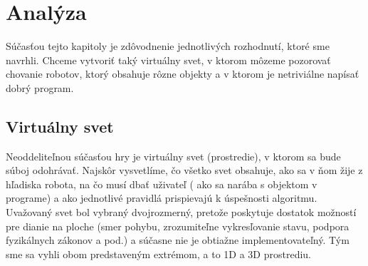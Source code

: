 \chapter{Analýza}
Súčasťou tejto kapitoly je zdôvodnenie jednotlivých rozhodnutí, ktoré sme navrhli. Chceme vytvoriť taký virtuálny svet, v ktorom môzeme pozorovať chovanie robotov, ktorý obsahuje rôzne objekty a v ktorom je netriviálne napísať dobrý program.
\section{Virtuálny svet}
Neoddeliteľnou súčasťou hry je virtuálny svet (prostredie), v ktorom sa bude súboj odohrávať. Najskôr vysvetlíme, čo všetko svet obsahuje, ako sa v ňom žije z hľadiska robota, na čo musí dbať uživateľ ( ako sa narába s objektom v programe) a ako jednotlivé pravidlá prispievajú k úspešnosti algoritmu. \\ 
Uvažovaný svet bol vybraný dvojrozmerný, pretože poskytuje dostatok možností pre dianie na ploche (smer pohybu, zrozumiteľne vykresľovanie stavu, podpora fyzikálnych zákonov a pod.) a súčasne nie je obtiažne implementovateľný. Tým sme sa vyhli obom predstaveným extrémom, a to 1D a 3D prostrediu.
